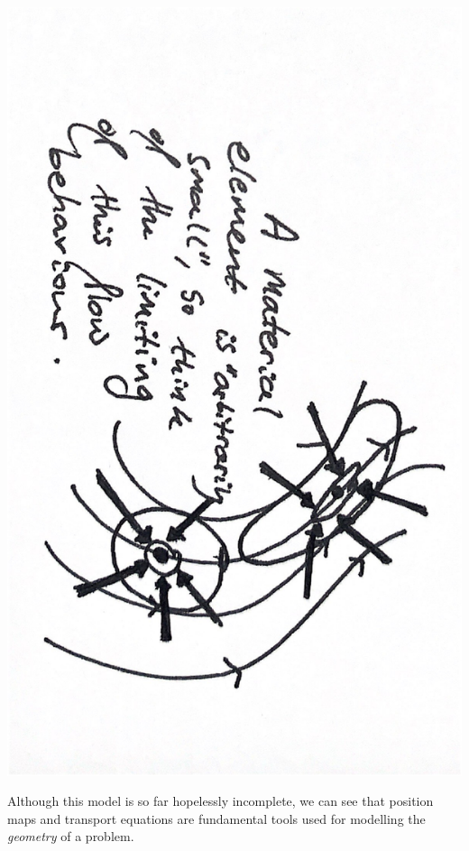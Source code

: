 \begin{center}
\includegraphics[angle=90,page=9,width=0.55\linewidth]{figures/2.pdf}
\end{center}

Although this model is so far hopelessly incomplete, we can see that position maps and transport equations are fundamental tools
used for modelling the \textit{geometry} of a problem.


% 
% 
